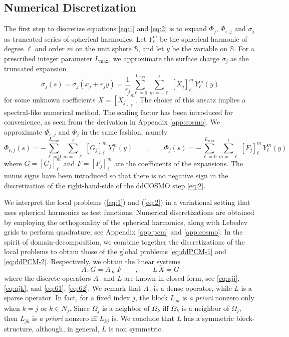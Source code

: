 \subsection{Numerical Discretization}

The first step to discretize equations \eqref{eq:1} and \eqref{eq:2} is to expand $\Phi_j$, $\Phi_{\varepsilon,j}$ and $\sigma_j$ as truncated series of spherical harmonics. Let $Y_\ell^m$ be the spherical harmonic of degree $\ell$ and order $m$ on the unit sphere $\mathbb{S}$, and let $y$ be the variable on $\mathbb{S}$. For a prescribed integer parameter ${L_\text{max}}$,  we approximate the surface charge $\sigma_j$ as the truncated expansion
\[
\sigma_j(s) = \sigma_j(x_j + r_j y) = \frac{1}{r_j} \, \sum_{\ell=0}^{L_\text{max}} \sum_{m = -\ell}^\ell \, [X_j]_\ell^m \, Y_\ell^m(y)
\]
for some unknown coefficients $X = [X_j]_\ell^m$. The choice of this ansatz implies a spectral-like numerical method. The scaling factor has been introduced for convenience, as seen from the derivation in Appendix \ref{app:cosmo}. We approximate $\Phi_{\varepsilon,j}$ and $\Phi_j$ in the same fashion, namely
\begin{equation}\label{eq:71}
\Phi_{\varepsilon,j}(s) = - \sum_{\ell=0}^{L_\text{max}} \sum_{m = -\ell}^\ell \, [G_j]_\ell^m \, Y_\ell^m(y) \qquad , \qquad \Phi_j(s) = -\sum_{\ell=0}^{L_\text{max}} \sum_{m = -\ell}^\ell \, [F_j]_\ell^m \, Y_\ell^m(y)
\end{equation}
where $G = [G_j]_\ell^m$ and $F = [F_j]_\ell^m$ are the coefficients of the expansions. The minus signs have been introduced so that there is no negative sign in the discretization of the right-hand-side of the ddCOSMO step \eqref{eq:2}. 


We interpret the local problems (\ref{eq:1}) and (\ref{eq:2}) in a variational setting that uses spherical harmonics as test functions. Numerical discretizations are obtained by employing the orthogonality of the spherical harmonics, along with Lebedev grids to perform quadrature, see Appendix \ref{app:pcm} and \ref{app:cosmo}. In the spirit of domain-decomposition, we combine together the discretizations of the local problems to obtain those of the global problems \eqref{eq:ddPCM-1} and \eqref{eq:ddPCM-2}. Respectively, we obtain the linear systems
\begin{equation}\label{eq:6}
A_\varepsilon \, G = A_\infty \, F \qquad , \qquad  L \, X = G
\end{equation}
where the discrete operators $A_\varepsilon$ and $L$ are known in closed form, see \eqref{eq:ajj}, \eqref{eq:ajk}, and \eqref{eq:61}, \eqref{eq:62}. We remark that $A_\varepsilon$ is a dense operator, while $L$ is a sparse operator. In fact, for a fixed index $j$, the block $L_{jk}$ is \emph{a priori} nonzero only when $k = j$ or $k \in N_j$. Since $\Omega_j$ is a neighbor of $\Omega_k$ iff $\Omega_k$ is a neighbor of $\Omega_j$, then $L_{jk}$ is \emph{a priori} nonzero iff $L_{kj}$ is. We conclude that $L$ has a symmetric block-structure, although, in general, $L$ is non symmetric.

